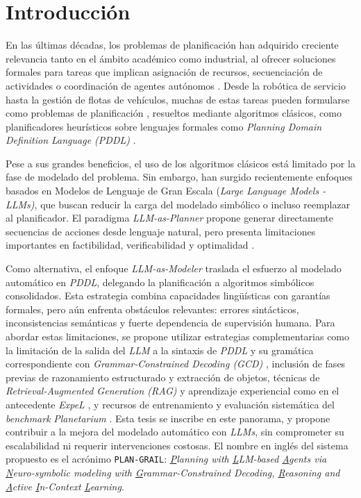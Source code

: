 \chapter*{Introducción}\label{chapter:introduction}

En las últimas décadas, los problemas de planificación han adquirido creciente relevancia tanto en el ámbito académico como industrial, al ofrecer soluciones formales para tareas que implican asignación de recursos, secuenciación de actividades o coordinación de agentes autónomos \parencite{li2024lasp, ghallab2004automated}. Desde la robótica de servicio hasta la gestión de flotas de vehículos, muchas de estas tareas pueden formularse como problemas de planificación \parencite{li2024lasp, karpas2020automated, marrella2019automated}, resueltos mediante algoritmos clásicos, como planificadores heurísticos sobre lenguajes formales como \textit{Planning Domain Definition Language (PDDL)} \parencite{aeronautiques1998pddl}. 

Pese a sus grandes beneficios, el uso de los algoritmos clásicos está limitado por la fase de modelado del problema. Sin embargo, han surgido recientemente enfoques basados en Modelos de Lenguaje de Gran Escala (\textit{Large Language Models - LLMs)}, que buscan reducir la carga del modelado simbólico o incluso reemplazar al planificador. El paradigma \textit{LLM-as-Planner} propone generar directamente secuencias de acciones desde lenguaje natural, pero presenta limitaciones importantes en factibilidad, verificabilidad y optimalidad \parencite{aghzal2025survey}. 

Como alternativa, el enfoque \textit{LLM-as-Modeler} traslada el esfuerzo al modelado automático en \textit{PDDL}, delegando la planificación a algoritmos simbólicos consolidados. Esta estrategia combina capacidades lingüísticas con garantías formales, pero aún enfrenta obstáculos relevantes: errores sintácticos, inconsistencias semánticas y fuerte dependencia de supervisión humana. Para abordar estas limitaciones, se propone utilizar estrategias complementarias como la limitación de la salida del \textit{LLM} a la sintaxis de \textit{PDDL} y su gramática correspondiente con  \textit{Grammar‑Constrained Decoding (GCD)} \parencite{geng2023grammar}, inclusión de fases previas de razonamiento estructurado y extracción de objetos, técnicas de \textit{Retrieval-Augmented Generation (RAG)} \parencite{gao2023retrieval} y aprendizaje experiencial como en el antecedente \textit{ExpeL} \parencite{zhao2024expel}, y recursos de entrenamiento y evaluación sistemática del \textit{benchmark} \textit{Planetarium} \parencite{zuo2024planetarium}. Esta tesis se inscribe en este panorama, y propone contribuir a la mejora del modelado automático con \textit{LLMs}, sin comprometer su escalabilidad ni requerir intervenciones costosas. El nombre en inglés del sistema propuesto es el acrónimo \texttt{PLAN-GRAIL}: \textit{\underline{P}lanning with \underline{L}LM-based \underline{A}gents via \underline{N}euro-symbolic modeling with \underline{G}rammar-Constrained Decoding, \underline{R}easoning and \underline{A}ctive \underline{I}n-Context \underline{L}earning}.

